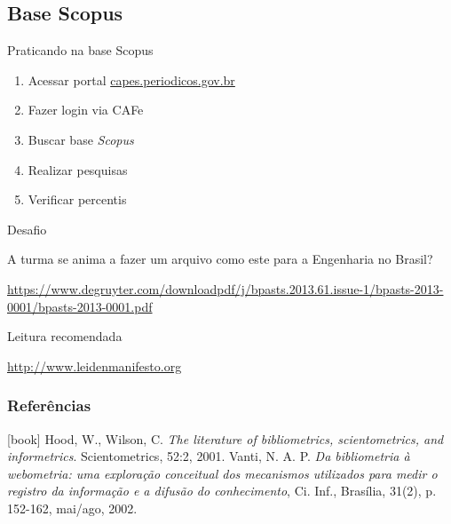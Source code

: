 \subsection{Base Scopus}

\begin{frame}{Praticando na base Scopus}
\begin{enumerate}
\item Acessar portal \url{capes.periodicos.gov.br}
\item Fazer login via CAFe
\item Buscar base \textit{Scopus}
\item Realizar pesquisas
\item Verificar percentis
\end{enumerate}
\end{frame}


\begin{frame}{Desafio}

A turma se anima a fazer um arquivo como este para a Engenharia no Brasil? 

\url{https://www.degruyter.com/downloadpdf/j/bpasts.2013.61.issue-1/bpasts-2013-0001/bpasts-2013-0001.pdf}

\end{frame}

\begin{frame}{Leitura recomendada}

\url{http://www.leidenmanifesto.org}

\end{frame}

\begin{frame}[allowframebreaks]
\frametitle{Referências}
\begin{thebibliography}{9}
[book]
%
Hood, W., Wilson, C. \textit{The literature of bibliometrics, scientometrics, and informetrics}. Scientometrics, 52:2, 2001.
Vanti, N. A. P. \textit{Da bibliometria à webometria: uma exploração conceitual dos mecanismos utilizados para medir o registro da informação e a difusão do conhecimento}, Ci. Inf., Brasília, 31(2), p. 152-162, mai/ago, 2002.
\end{thebibliography}
\end{frame}
